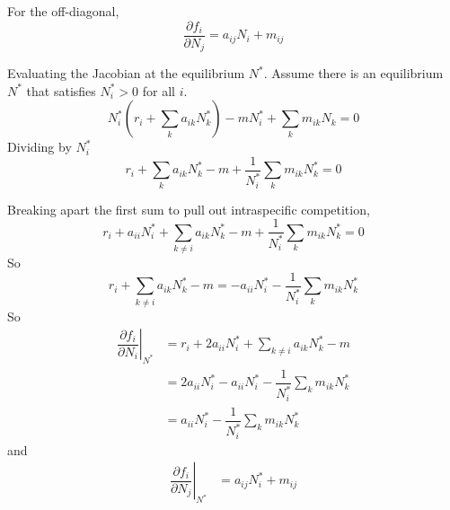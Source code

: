 \documentclass{article}
\begin{document}
For the off-diagonal,
\begin{equation}
\dfrac{\partial f_i}{\partial N_j} = a_{ij} N_i + m_{ij}
\end{equation}

Evaluating the Jacobian at the equilibrium $N^*$. Assume there is an equilibrium $N^*$ that satisfies $N^*_i>0$ for all $i$.
\begin{equation}
    N^*_i\left(r_i+\sum_k a_{ik}N^*_k\right)-mN^*_i+\sum_k m_{ik}N_k=0
\end{equation}
Dividing by $N_i^*$
\begin{equation}
r_i+\sum_k a_{ik}N^*_k-m+\dfrac{1}{N^*_i}\sum_k m_{ik}N^*_k=0
\end{equation}

Breaking apart the first sum to pull out intraspecific competition,
\begin{equation}
    r_i+a_{ii}N_i^* + \sum_{k \neq i} a_{ik}N^*_k-m+\dfrac{1}{N^*_i}\sum_k m_{ik}N^*_k=0
\end{equation}
So
\begin{equation}
    r_i+\sum_{k \neq i} a_{ik}N^*_k-m=-a_{ii}N_i^* - \dfrac{1}{N^*_i}\sum_k m_{ik}N^*_k
\end{equation}
So
\begin{align}
    \left.\dfrac{\partial f_i}{\partial N_i} \right \rvert_{N^*} 
    &= r_i + 2a_{ii} N^*_i + \sum_{k\neq i} a_{ik}N^*_k - m \\
    &= 2a_{ii}N^*_i-a_{ii}N_i^* - \dfrac{1}{N^*_i}\sum_k m_{ik}N^*_k \\
    &= a_{ii}N^*_i- \dfrac{1}{N^*_i}\sum_k m_{ik}N^*_k
\end{align}
and
\begin{align}
    \left.\dfrac{\partial f_i}{\partial N_j} \right \rvert_{N^*} 
    &= a_{ij} N^*_i + m_{ij}
\end{align}
\end{document}

